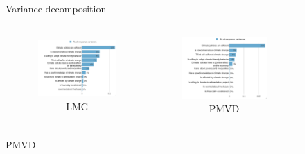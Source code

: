 \documentclass{article}
\begin{document}
\begin{figure}[h!]
\begin{center}
	\caption{Variance decomposition}
	\caption*{Index Green Investments}
	\setlength\extrarowheight{-1pt}
	\begin{tabular}{cc}
		\begin{subfigure}{0.5\textwidth}
		\caption{LMG}
			\includegraphics[width=\textwidth]{lmg_investments_non_standardized}
		\end{subfigure}&
		\begin{subfigure}{0.5\textwidth}
		\caption{PMVD}
			\includegraphics[width=\textwidth]{pmvd_investments_non_standardized}
		\end{subfigure}\\
	\end{tabular}


\end{center}
\end{figure}
\end{document}
